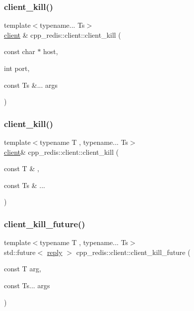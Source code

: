 \subsubsection{\texorpdfstring{client\+\_\+kill()}{client\_kill()}\hspace{0.1cm}{\footnotesize\ttfamily [4/5]}}
{\footnotesize\ttfamily template$<$typename... Ts$>$ \\
\hyperlink{classcpp__redis_1_1client}{client} \& cpp\+\_\+redis\+::client\+::client\+\_\+kill (\begin{DoxyParamCaption}\item[{const char $\ast$}]{host,  }\item[{int}]{port,  }\item[{const Ts \&...}]{args }\end{DoxyParamCaption})\hspace{0.3cm}{\ttfamily [inline]}}

\mbox{\label{classcpp__redis_1_1client_a1e2dd6cdcdb4307ceda0f866fe0a154f}} 
\subsubsection{\texorpdfstring{client\+\_\+kill()}{client\_kill()}\hspace{0.1cm}{\footnotesize\ttfamily [5/5]}}
{\footnotesize\ttfamily template$<$typename T , typename... Ts$>$ \\
\hyperlink{classcpp__redis_1_1client}{client}\& cpp\+\_\+redis\+::client\+::client\+\_\+kill (\begin{DoxyParamCaption}\item[{const T \&}]{,  }\item[{const Ts \&}]{... }\end{DoxyParamCaption})}

\mbox{\label{classcpp__redis_1_1client_ae6f09b6c022c910b79fb90a47291f511}} 
\subsubsection{\texorpdfstring{client\+\_\+kill\+\_\+future()}{client\_kill\_future()}}
{\footnotesize\ttfamily template$<$typename T , typename... Ts$>$ \\
std\+::future$<$ \hyperlink{classcpp__redis_1_1reply}{reply} $>$ cpp\+\_\+redis\+::client\+::client\+\_\+kill\+\_\+future (\begin{DoxyParamCaption}\item[{const T}]{arg,  }\item[{const Ts...}]{args }\end{DoxyParamCaption})}

